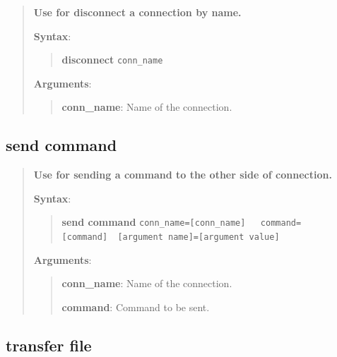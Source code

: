 \begin{quote}
\textbf{Use for disconnect a connection by name.}

\textbf{Syntax}:

\begin{quote}
\textbf{disconnect} \texttt{conn\_name}
\end{quote}

\textbf{Arguments}:

\begin{quote}
\textbf{conn\_name}: Name of the connection.
\end{quote}
\end{quote}

\hypertarget{description-send-command}{%
\subsection{\texorpdfstring{\textbf{send
command}}{send command}}\label{description-send-command}}

\begin{quote}
\textbf{Use for sending a command to the other side of connection.}

\textbf{Syntax}:

\begin{quote}

\textbf{send command}
\texttt{conn\_name={[}conn\_name{]}\ \ \ command={[}command{]}\ \ {[}argument name{]}={[}argument value{]}}
\end{quote}

\textbf{Arguments}:

\begin{quote}
\textbf{conn\_name}: Name of the connection.

\textbf{command}: Command to be sent.
\end{quote}
\end{quote}

\hypertarget{description-transfer-file}{%
\subsection{\texorpdfstring{\textbf{transfer file}}{transfer file}}\label{description-transfer-file}}

